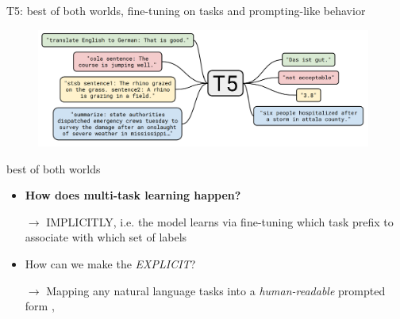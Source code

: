 


\begin{frame}{T5: best of both worlds, fine-tuning on tasks
and prompting-like behavior}

\vfill
	
	\begin{figure}
		\centering
		\includegraphics[width = 11cm]{figure/62-t5.png}\\ 
	\end{figure}

\vfill

\end{frame}


\begin{frame}{best of both worlds}

\vfill

\begin{itemize}
    \item \ques \textbf{How does multi-task learning happen?}
    \item[$\to$] IMPLICITLY, i.e. the model learns via fine-tuning which task prefix to associate with which set of labels
    \item \ques How can we make the \textit{EXPLICIT}?
    \item[$\to$] Mapping any natural language tasks into
    a \textit{human-readable} prompted form
,
\end{itemize}

\vfill

\end{frame}

